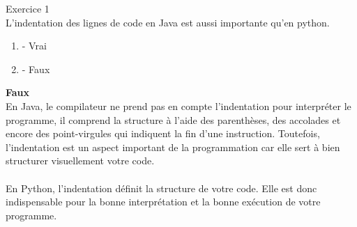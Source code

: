 \begin{Exercice}[2 minutes] Exercice 1\\
L'indentation des lignes de code en Java est aussi importante qu'en python.
\begin{enumerate}[label=\Alph*]
    \item - Vrai
    \item - Faux
\end{enumerate}
\begin{solution}
    \textbf{Faux}
    \\En Java, le compilateur ne prend pas en compte l'indentation pour interpréter le programme, il comprend la structure à l'aide des parenthèses, des accolades et encore des point-virgules qui indiquent la fin d'une instruction. Toutefois, l'indentation est un aspect important de la programmation car elle sert à bien structurer visuellement votre code.\\\\
    En Python, l'indentation définit la structure de votre code. Elle est donc indispensable pour la bonne interprétation et la bonne exécution de votre programme. 
\end{solution}
\end{Exercice}



